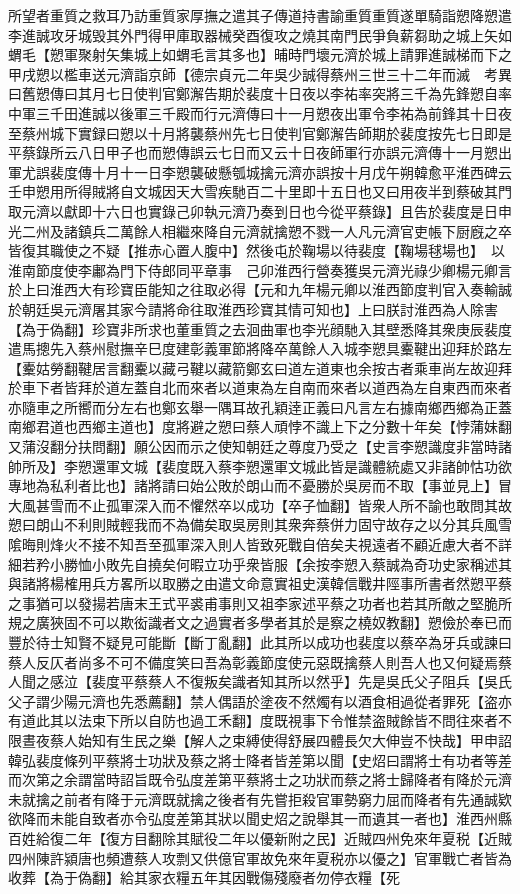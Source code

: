 所望者重質之救耳乃訪重質家厚撫之遣其子傳道持書諭重質重質遂單騎詣愬降愬遣李進誠攻牙城毁其外門得甲庫取器械癸酉復攻之燒其南門民爭負薪芻助之城上矢如蝟毛【愬軍聚射矢集城上如蝟毛言其多也】晡時門壞元濟於城上請罪進誠梯而下之甲戌愬以檻車送元濟詣京師【德宗貞元二年吳少誠得蔡州三世三十二年而滅　考異曰舊愬傳曰其月七日使判官鄭澥告期於裴度十日夜以李祐率突將三千為先鋒愬自率中軍三千田進誠以後軍三千殿而行元濟傳曰十一月愬夜出軍令李祐為前鋒其十日夜至蔡州城下實録曰愬以十月將襲蔡州先七日使判官鄭澥告師期於裴度按先七日即是平蔡錄所云八日甲子也而愬傳誤云七日而又云十日夜師軍行亦誤元濟傳十一月愬出軍尤誤裴度傳十月十一日李愬襲破懸瓠城擒元濟亦誤按十月戊午朔韓愈平淮西碑云壬申愬用所得賊將自文城因天大雪疾馳百二十里即十五日也又曰用夜半到蔡破其門取元濟以獻即十六日也實錄己卯執元濟乃奏到日也今從平蔡錄】且告於裴度是日申光二州及諸鎮兵二萬餘人相繼來降自元濟就擒愬不戮一人凡元濟官吏帳下厨廐之卒皆復其職使之不疑【推赤心置人腹中】然後屯於鞠場以待裴度【鞠場毬場也】　以淮南節度使李鄘為門下侍郎同平章事　己卯淮西行營奏獲吳元濟光祿少卿楊元卿言於上曰淮西大有珍寶臣能知之往取必得【元和九年楊元卿以淮西節度判官入奏輸誠於朝廷吳元濟屠其家今請將命往取淮西珍寶其情可知也】上曰朕討淮西為人除害【為于偽翻】珍寶非所求也董重質之去洄曲軍也李光顔馳入其壁悉降其衆庚辰裴度遣馬摠先入蔡州慰撫辛巳度建彰義軍節將降卒萬餘人入城李愬具櫜鞬出迎拜於路左【櫜姑勞翻鞬居言翻櫜以藏弓鞬以藏箭鄭玄曰道左道東也余按古者乘車尚左故迎拜於車下者皆拜於道左蓋自北而來者以道東為左自南而來者以道西為左自東西而來者亦隨車之所嚮而分左右也鄭玄舉一隅耳故孔穎逹正義曰凡言左右據南鄉西鄉為正蓋南鄉君道也西鄉主道也】度將避之愬曰蔡人頑悖不識上下之分數十年矣【悖蒲妹翻又蒲沒翻分扶問翻】願公因而示之使知朝廷之尊度乃受之【史言李愬識度非當時諸帥所及】李愬還軍文城【裴度既入蔡李愬還軍文城此皆是識體統處又非諸帥怙功欲專地為私利者比也】諸將請曰始公敗於朗山而不憂勝於吳房而不取【事並見上】冒大風甚雪而不止孤軍深入而不懼然卒以成功【卒子恤翻】皆衆人所不諭也敢問其故愬曰朗山不利則賊輕我而不為備矣取吳房則其衆奔蔡併力固守故存之以分其兵風雪隂晦則烽火不接不知吾至孤軍深入則人皆致死戰自倍矣夫視遠者不顧近慮大者不詳細若矜小勝恤小敗先自撓矣何暇立功乎衆皆服【余按李愬入蔡誠為奇功史家稱述其與諸將楊榷用兵方畧所以取勝之由遣文命意實祖史漢韓信戰井陘事所書者然愬平蔡之事猶可以發揚若唐末王式平裘甫事則又祖李家述平蔡之功者也若其所敵之堅脆所規之廣狹固不可以欺衒識者文之過實者多學者其於是察之橈奴教翻】愬儉於奉已而豐於待士知賢不疑見可能斷【斷丁亂翻】此其所以成功也裴度以蔡卒為牙兵或諫曰蔡人反仄者尚多不可不備度笑曰吾為彰義節度使元惡既擒蔡人則吾人也又何疑焉蔡人聞之感泣【裴度平蔡蔡人不復叛矣識者知其所以然乎】先是吳氏父子阻兵【吳氏父子謂少陽元濟也先悉薦翻】禁人偶語於塗夜不然燭有以酒食相過從者罪死【盗亦有道此其以法束下所以自防也過工禾翻】度既視事下令惟禁盗賊餘皆不問往來者不限晝夜蔡人始知有生民之樂【解人之束縛使得舒展四體長欠大伸豈不快哉】甲申詔韓弘裴度條列平蔡將士功狀及蔡之將士降者皆差第以聞【史炤曰謂將士有功者等差而次第之余謂當時詔旨既令弘度差第平蔡將士之功狀而蔡之將士歸降者有降於元濟未就擒之前者有降于元濟既就擒之後者有先嘗拒殺官軍勢窮力屈而降者有先通誠欵欲降而未能自致者亦令弘度差第其狀以聞史炤之說舉其一而遺其一者也】淮西州縣百姓給復二年【復方目翻除其賦役二年以優新附之民】近賊四州免來年夏税【近賊四州陳許潁唐也頻遭蔡人攻剽又供億官軍故免來年夏税亦以優之】官軍戰亡者皆為收葬【為于偽翻】給其家衣糧五年其因戰傷殘廢者勿停衣糧【死